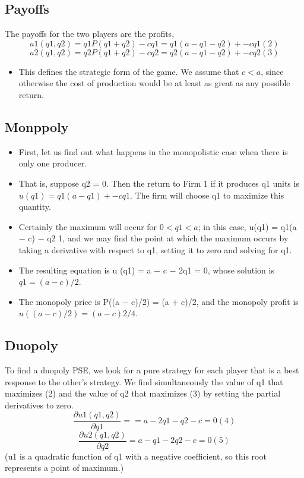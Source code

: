 \documentclass[]{article}
\begin{document}
\subsection*{Payoffs}
The payoffs for the two players are the profits,
\[u1(q1, q2) = q1P(q1 + q2) − cq1 = q1(a − q1 − q2)
+ − cq1 (2)\]
\[u2(q1, q2) = q2P(q1 + q2) − cq2 = q2(a − q1 − q2)
+ − cq2 (3)\]
\begin{itemize}
    \item This defines the strategic form of the game. We assume that $c<a$, since otherwise the
cost of production would be at least as great as any possible return.
\end{itemize}
\subsection{Monppoly}
\begin{itemize}


\item First, let us find out what happens in the monopolistic case when there is only one
producer. 
\item That is, suppose q2 = 0. Then the return to Firm 1 if it produces q1 units is
$u(q1) = q1(a − q1)+ − cq1$. The firm will choose q1 to maximize this quantity. 
\item Certainly
the maximum will occur for $0 < q1 < a$; in this case, u(q1) = q1(a − c) − q2
1, and we may
find the point at which the maximum occurs by taking a derivative with respect to q1,
setting it to zero and solving for q1.
\item The resulting equation is u
(q1) = a − c − 2q1 = 0,
whose solution is $q1 = (a − c)/2$. 
\item The monopoly price is P((a − c)/2) = (a + c)/2, and the
monopoly profit is $u((a − c)/2) = (a − c)2/4$.
\end{itemize}

\subsection{Duopoly}
To find a duopoly PSE, we look for a pure strategy for each player that is a best
response to the other’s strategy. We find simultaneously the value of q1 that maximizes
(2) and the value of q2 that maximizes (3) by setting the partial derivatives to zero.
\[\frac{\partial u1(q1, q2)}{\partial q1} =
 = a − 2q1 − q2 − c = 0 (4)\]
\[
\frac{\partial u2(q1, q2)}{\partial q2}  = a − q1 − 2q2 − c = 0 (5)\]
(u1 is a quadratic function of q1 with a negative coefficient, so this root represents a point
of maximum.) 
\\
\end{document}
